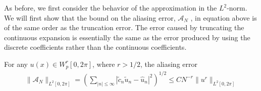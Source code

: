     As before, we first consider the behavior of the approximation in the $L^2$-norm. We will first show that the bound on the aliasing error, $\mathcal{A}_N$ , in equation above is of the same order as the truncation error. The error caused by truncating the continuous expansion is essentially the same as the error produced by using the discrete coefficients rather than the continuous coefficients.
    \begin{lemma}
    \label{estimating_aliasing_error}	
    For any $u(x) \in W_p^r [0, 2\pi]$, where $r > 1/2$, the aliasing error
    \begin{align*}
        \| \mathcal{A}_N \|_{L^2 [0, 2\pi]} = \displaystyle \left(\sum_{|n| \leq \infty} |\widetilde{c}_n \widetilde{u}_n - \hat{u}_n|^2 \right)^{1/2} \leq CN^{-r} \|u^{r}\|_{L^2 [0, 2\pi]}
    \end{align*}
	\end{lemma}
